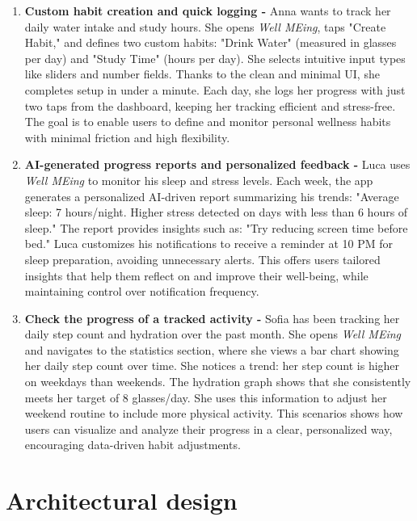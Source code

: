 \documentclass{article}
\begin{document}
\vspace{5pt}
\begin{enumerate}[label=\textbf{S\arabic* -}]
    \setlength{\itemsep}{5pt}

    \item \textbf{Custom habit creation and quick logging -}
    Anna wants to track her daily water intake and study hours. She opens \textit{Well MEing}, taps "Create Habit," and defines two custom habits: "Drink Water" (measured in glasses per day) and "Study Time" (hours per day). She selects intuitive input types like sliders and number fields. Thanks to the clean and minimal UI, she completes setup in under a minute. Each day, she logs her progress with just two taps from the dashboard, keeping her tracking efficient and stress-free.
    The goal is to enable users to define and monitor personal wellness habits with minimal friction and high flexibility.

    \item \textbf{AI-generated progress reports and personalized feedback -}
    Luca uses \textit{Well MEing} to monitor his sleep and stress levels. Each week, the app generates a personalized AI-driven report summarizing his trends: "Average sleep: 7 hours/night. Higher stress detected on days with less than 6 hours of sleep." The report provides insights such as: "Try reducing screen time before bed." Luca customizes his notifications to receive a reminder at 10 PM for sleep preparation, avoiding unnecessary alerts.
    This offers users tailored insights that help them reflect on and improve their well-being, while maintaining control over notification frequency.

    \item \textbf{Check the progress of a tracked activity -}
    Sofia has been tracking her daily step count and hydration over the past month. She opens \textit{Well MEing} and navigates to the statistics section, where she views a bar chart showing her daily step count over time. She notices a trend: her step count is higher on weekdays than weekends. The hydration graph shows that she consistently meets her target of 8 glasses/day. She uses this information to adjust her weekend routine to include more physical activity.
    This scenarios shows how users can visualize and analyze their progress in a clear, personalized way, encouraging data-driven habit adjustments.

\end{enumerate}

\section{Architectural design}
\end{document}
